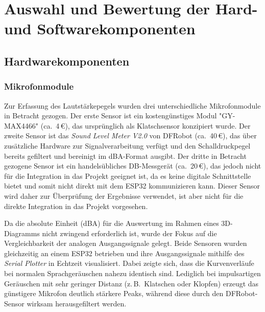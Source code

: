 \chapter{Auswahl und Bewertung der Hard- und Softwarekomponenten}

\section{Hardwarekomponenten}

\subsection{Mikrofonmodule}

Zur Erfassung des Lautstärkepegels wurden drei unterschiedliche Mikrofonmodule in Betracht gezogen. 
Der erste Sensor ist ein kostengünstiges Modul "GY-MAX4466" (ca.\ 4\,€), das ursprünglich als Klatschsensor konzipiert wurde. 
Der zweite Sensor ist das \textit{Sound Level Meter V2.0} von DFRobot (ca.\ 40\,€), das über zusätzliche Hardware zur Signalverarbeitung verfügt und den Schalldruckpegel bereits gefiltert und bereinigt im dBA-Format ausgibt.
Der dritte in Betracht gezogene Sensor ist ein handelsübliches DB-Messgerät (ca.\ 20\,€), das jedoch nicht für die Integration in das Projekt geeignet ist, da es keine digitale Schnittstelle bietet und somit nicht direkt mit dem ESP32 kommunizieren kann.
Dieser Sensor wird daher zur Überprüfung der Ergebnisse verwendet, ist aber nicht für die direkte Integration in das Projekt vorgesehen.

Da die absolute Einheit (dBA) für die Auswertung im Rahmen eines 3D-Diagramms nicht zwingend erforderlich ist, wurde der Fokus auf die Vergleichbarkeit der analogen Ausgangssignale gelegt. 
Beide Sensoren wurden gleichzeitig an einem ESP32 betrieben und ihre Ausgangssignale mithilfe des \textit{Serial Plotter} in Echtzeit visualisiert. 
Dabei zeigte sich, dass die Kurvenverläufe bei normalen Sprachgeräuschen nahezu identisch sind. 
Lediglich bei impulsartigen Geräuschen mit sehr geringer Distanz (z.\,B.\ Klatschen oder Klopfen) erzeugt das günstigere Mikrofon deutlich stärkere Peaks, während diese durch den DFRobot-Sensor wirksam herausgefiltert werden.

